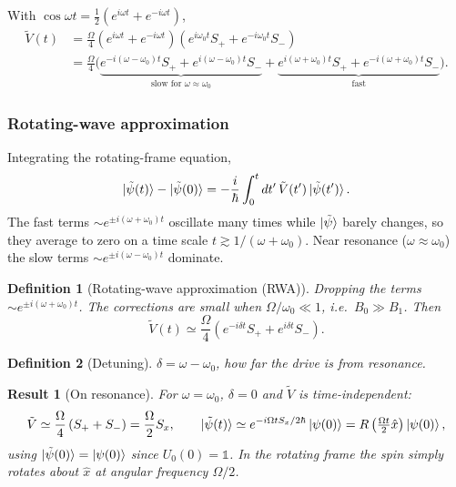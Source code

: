 \documentclass{article}
\newtheorem{definition}{Definition}
\newtheorem{result}{Result}
\newcommand{\id}{\mathds{1}}
\begin{document}
With $\cos\omega t = \frac{1}{2}\left(e^{i\omega t} + e^{-i\omega t}\right)$,
\begin{equation}
    \begin{split}
        \tilde{V}(t) &= \frac{\Omega}{4}\left(e^{i\omega t} + e^{-i\omega t}\right)\left(e^{i\omega_0t}S_+ + e^{-i\omega_0t}S_-\right) \\
        &= \frac{\Omega}{4}\Big(\underbrace{e^{-i(\omega-\omega_0)t}S_+ + e^{i(\omega-\omega_0)t}S_-}_{\text{slow for } \omega\approx\omega_0} + \underbrace{e^{i(\omega+\omega_0)t}S_+ + e^{-i(\omega+\omega_0)t}S_-}_{\text{fast}}\Big).
    \end{split}
\end{equation}

\subsubsection{Rotating-wave approximation}
Integrating the rotating-frame equation,
\[\ket{\tilde{\psi}(t)} - \ket{\tilde{\psi}(0)} = -\frac{i}{\hbar}\int_0^t dt'\,\tilde{V}(t')\ket{\tilde{\psi}(t')}.\]
The fast terms $\sim e^{\pm i(\omega+\omega_0)t}$ oscillate many times while $\ket{\tilde{\psi}}$ barely changes, so they average to zero on a time scale $t \gtrsim 1/(\omega+\omega_0)$. Near resonance ($\omega \approx \omega_0$) the slow terms $\sim e^{\pm i(\omega-\omega_0)t}$ dominate.
\begin{definition}[Rotating-wave approximation (RWA)]
    Dropping the terms $\sim e^{\pm i(\omega+\omega_0)t}$. The corrections are small when $\Omega/\omega_0 \ll 1$, i.e.\ $B_0 \gg B_1$. Then
    \begin{equation}
        \tilde{V}(t) \simeq \frac{\Omega}{4}\left(e^{-i\delta t}S_+ + e^{i\delta t}S_-\right).
    \end{equation}
\end{definition}
\begin{definition}[Detuning]
    $\delta = \omega - \omega_0$, how far the drive is from resonance.
\end{definition}
\begin{result}[On resonance]
    For $\omega = \omega_0$, $\delta = 0$ and $\tilde{V}$ is time-independent:
    \begin{equation}
        \tilde{V} \simeq \frac{\Omega}{4}\left(S_+ + S_-\right) = \frac{\Omega}{2}S_x, \qquad \ket{\tilde{\psi}(t)} \simeq e^{-i\Omega tS_x/2\hbar}\ket{\psi(0)} = R\left(\tfrac{\Omega t}{2}\hat{x}\right)\ket{\psi(0)},
    \end{equation}
    using $\ket{\tilde{\psi}(0)} = \ket{\psi(0)}$ since $U_0(0) = \id$. In the rotating frame the spin simply rotates about $\hat{x}$ at angular frequency $\Omega/2$.
\end{result}
\end{document}
